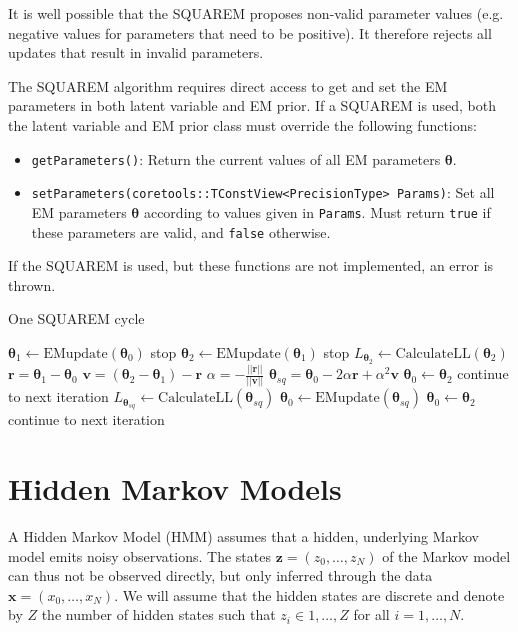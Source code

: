 \documentclass[a4paper,11pt]{article}
\def\r{\boldsymbol{r}}
\def\v{\boldsymbol{v}}
\def\x{\boldsymbol{x}}
\def\z{\boldsymbol{z}}
\def\btheta{\boldsymbol{\theta}}
\newcommand{\func}[1]{\texttt{#1}}
\newcommand{\pubfunc}[1]{\texttt{#1()}}
\begin{document}
It is well possible that the SQUAREM proposes non-valid parameter values (e.g. negative values for parameters that need to be positive). It therefore rejects all updates that result in invalid parameters.

The SQUAREM algorithm requires direct access to get and set the EM parameters in both latent variable and EM prior. If a SQUAREM is used, both the latent variable and EM prior class must override the following functions:

\begin{itemize}
 \item \pubfunc{getParameters}: Return the current values of all EM parameters $\btheta$.
 \item \func{setParameters(coretools::TConstView<PrecisionType> Params)}: Set all EM parameters $\btheta$ according to values given in \texttt{Params}. Must return \texttt{true} if these parameters are valid, and \texttt{false} otherwise.
\end{itemize}

If the SQUAREM is used, but these functions are not implemented, an error is thrown.

\begin{algorithm}[t]
\caption{One SQUAREM cycle}\label{algo:SQUAREM}
\begin{algorithmic}
\State $\btheta_1 \gets \mbox{EMupdate}(\btheta_0)$
  \State stop
\EndIf
\State $\btheta_2 \gets \mbox{EMupdate}(\btheta_1)$
  \State stop
\EndIf
\State $L_{\btheta_2} \gets \mbox{CalculateLL}(\btheta_2)$
\State $\r = \btheta_1 - \btheta_0$
\State $\v = (\btheta_2 - \btheta_1) - \r$
\State $\alpha = -\frac{||\r||}{||\v||}$
\State $\btheta_{sq} = \btheta_0 - 2 \alpha \r + \alpha^2 \v$
\If{$\btheta_{sq}$ is not valid}
  \State $\btheta_0 \gets \btheta_2$
  \State continue to next iteration
\EndIf
\State $L_{\btheta_{sq}} \gets \mbox{CalculateLL}(\btheta_{sq})$
\If{$L_{\btheta_{sq}} > L_{\btheta_2}$}
  \State $\btheta_0 \gets \mbox{EMupdate}(\btheta_{sq})$
\Else
  \State  $\btheta_0 \gets \btheta_2$
\EndIf
\State continue to next iteration
\end{algorithmic}
\end{algorithm}

\section{Hidden Markov Models}\label{hmm}
A Hidden Markov Model (HMM) assumes that a hidden, underlying Markov model emits noisy observations. The states $\z = (z_0, \ldots, z_N)$ of the Markov model can thus not be observed directly, but only inferred through the data $\x = (x_0, \ldots, x_N)$. We will assume that the hidden states are discrete and denote by $Z$ the number of hidden states such that $z_i \in 1, \ldots, Z$ for all $i = 1, \ldots, N$.
\end{document}
